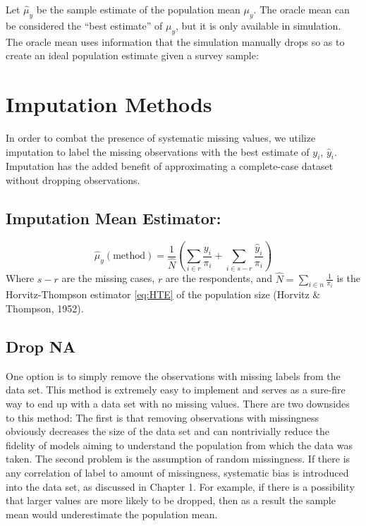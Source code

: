 \documentclass[12pt,twoside]{reedthesis}
\begin{document}
Let \(\hat \mu_y\) be the sample estimate of the population mean
\(\mu_y\). The oracle mean can be considered the ``best estimate'' of
\(\mu_y\), but it is only available in simulation. The oracle mean uses
information that the simulation manually drops so as to create an ideal
population estimate given a survey sample:

\section{Imputation Methods}\label{imputation-methods}

In order to combat the presence of systematic missing values, we utilize
imputation to label the missing observations with the best estimate of
\(y_i\), \(\hat y_i\). Imputation has the added benefit of approximating
a complete-case dataset without dropping observations.

\subsection{Imputation Mean Estimator:}\label{imputation-mean-estimator}

\[
\hat \mu_y(\text{method}) = \frac{1}{\hat N} (\sum_{i \in r} \frac{y_i}{\pi_i} + \sum_{i \in s-r} \frac{\hat y_i}{\pi_i})
\] Where \(s-r\) are the missing cases, \(r\) are the respondents, and
\(\hat N = \sum_{i \in n} \frac{1}{\pi_i}\) is the Horvitz-Thompson
estimator \eqref{eq:HTE} of the population size (Horvitz \& Thompson,
1952).

\subsection{Drop NA}\label{drop-na}

One option is to simply remove the observations with missing labels from
the data set. This method is extremely easy to implement and serves as a
sure-fire way to end up with a data set with no missing values. There
are two downsides to this method: The first is that removing
observations with missingness obviously decreases the size of the data
set and can nontrivially reduce the fidelity of models aiming to
understand the population from which the data was taken. The second
problem is the assumption of random missingness. If there is any
correlation of label to amount of missingness, systematic bias is
introduced into the data set, as discussed in Chapter 1. For example, if
there is a possibility that larger values are more likely to be dropped,
then as a result the sample mean would underestimate the population
mean.
\end{document}
